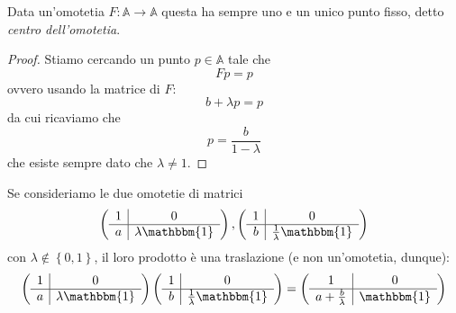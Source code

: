 \documentclass[11pt]{scrartcl}
\renewcommand{\AA}{\mathbb{A}}
\begin{document}
   	 \begin{proposition}
   	 	Data un'omotetia $F:\AA\to\AA$ questa ha sempre uno e un unico punto fisso, detto \textit{centro dell'omotetia}. 
   	 \end{proposition}
   	 \begin{proof}
   	 	Stiamo cercando un punto $p\in\AA$ tale che 
   	 	$$Fp=p$$
   	 	ovvero usando la matrice di $F$:
   	 	$$b+\lambda p = p$$
   	 	da cui ricaviamo che 
   	 	$$p=\frac{b}{1-\lambda}$$
   	 	che esiste sempre dato che $\lambda\ne 1$.
   	 \end{proof}
   	 \begin{example}
   	 	Se consideriamo le due omotetie di matrici
   	 	$$
   	 	\left(
   	 	\begin{array}{c|c}
   	 		1 & 0 \\
   	 		\hline
   	 		a & \lambda \mathbbm{1}
   	 	\end{array}
   	 	\right),
   	 	\left(
   	 	\begin{array}{c|c}
   	 		1 & 0 \\
   	 		\hline 
   	 		b & \frac{1}{\lambda}\mathbbm{1}
   	 	\end{array}
   	 	\right)
   	 	$$
   	 	con $\lambda\not\in \left\{0,1\right\}$, il loro prodotto è una traslazione (e non un'omotetia, dunque):
   	 	$$
   	 	\left(
   	 	\begin{array}{c|c}
   	 		1 & 0 \\
   	 		\hline
   	 		a & \lambda \mathbbm{1}
   	 	\end{array}
   	 	\right)
   	 	\left(
   	 	\begin{array}{c|c}
   	 		1 & 0 \\
   	 		\hline 
   	 		b & \frac{1}{\lambda}\mathbbm{1}
   	 	\end{array}
   	 	\right)=
   	 	\left(
   	 	\begin{array}{c|c}
   	 		1 & 0 \\
   	 		\hline
   	 		a+\frac{b}{\lambda} & \mathbbm{1}
   	 	\end{array}
   	 	\right)
   	 	$$
   	 \end{example}
\end{document}
